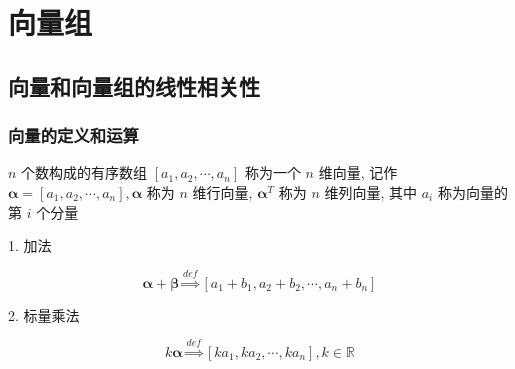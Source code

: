 \chapter{向量组}

\section{向量和向量组的线性相关性}

\subsection{向量的定义和运算}
\begin{definition}[向量的定义]
	$n$ 个数构成的有序数组 $[a_{1},a_{2},\cdots,a_{n}]$ 称为一个 $n$ 维向量, 记作 
	$\boldsymbol{\alpha} = [a_{1},a_{2},\cdots,a_{n}], \boldsymbol{\alpha}$ 称为 $n$ 维行向量,
	$\boldsymbol{\alpha}^{T}$ 称为 $n$ 维列向量, 其中 $a_{i}$ 称为向量的第 $i$ 个分量
\end{definition}
\begin{definition}[向量的线性运算]
	\textcolor{purpleb}{1. 加法}

	$$\boldsymbol{\alpha} + \boldsymbol{\beta} \overset{def}{\Longrightarrow}[a_{1}+b_{1},a_{2}+b_{2},\cdots,a_{n}+b_{n}]$$
	
	\textcolor{purpleb}{2. 标量乘法}

	$$k \boldsymbol{\alpha}\overset{def}{\Longrightarrow}[ka_{1},ka_{2},\cdots,ka_{n}], k\in \mathbb{R}$$
	
\end{definition}
